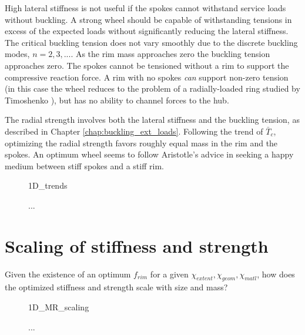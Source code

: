 \documentclass[\rootdir/thesis.tex]{subfiles}
\begin{document}
High lateral stiffness is not useful if the spokes cannot withstand service loads without buckling. A strong wheel should be capable of withstanding tensions in excess of the expected loads without significantly reducing the lateral stiffness. The critical buckling tension does not vary smoothly due to the discrete buckling modes, $n=2,3,...$. As the rim mass approaches zero the buckling tension approaches zero. The spokes cannot be tensioned without a rim to support the compressive reaction force. A rim with no spokes \emph{can} support non-zero tension (in this case the wheel reduces to the problem of a radially-loaded ring studied by Timoshenko \cite{Timoshenko1961}), but has no ability to channel forces to the hub.

The radial strength involves both the lateral stiffness and the buckling tension, as described in Chapter \ref{chap:buckling_ext_loads}. Following the trend of $\bar{T}_c$, optimizing the radial strength favors roughly equal mass in the rim and the spokes. An optimum wheel seems to follow Aristotle's advice in seeking a happy medium between stiff spokes and a stiff rim.

\begin{figure}
\centering
{1D_trends}
\caption{...}
\label{fig:opt_1D_trends}
\end{figure}

\section{Scaling of stiffness and strength}

Given the existence of an optimum $f_{rim}$ for a given $\chi_{extent},\chi_{geom},\chi_{matl}$, how does the optimized stiffness and strength scale with size and mass?

\begin{figure}
\centering
{1D_MR_scaling}
\caption{...}
\label{fig:opt_1D_scaling}
\end{figure}

\inprogress
\end{document}
